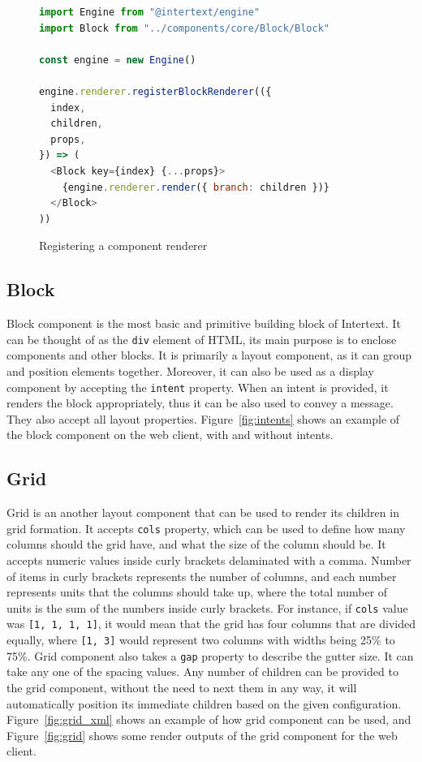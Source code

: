 \begin{figure}
\begin{minipage}{\linewidth}
\begin{lstlisting}[language=javascript]
import Engine from "@intertext/engine"
import Block from "../components/core/Block/Block"

const engine = new Engine()

engine.renderer.registerBlockRenderer(({
  index,
  children,
  props,
}) => (
  <Block key={index} {...props}>
    {engine.renderer.render({ branch: children })}
  </Block>
))
\end{lstlisting}
\end{minipage}
\caption{Registering a component renderer}%
\label{fig:registering_renderer}%
\end{figure}

\subsection{Block}

Block component is the most basic and primitive building block of Intertext. It can be thought of as the \texttt{div} element of HTML, its main purpose is to enclose components and other blocks. It is primarily a layout component, as it can group and position elements together. Moreover, it can also be used as a display component by accepting the \texttt{intent} property. When an intent is provided, it renders the block appropriately, thus it can be also used to convey a message. They also accept all layout properties. Figure~\ref{fig:intents} shows an example of the block component on the web client, with and without intents.

\subsection{Grid}

Grid is an another layout component that can be used to render its children in grid formation. It accepts \texttt{cols} property, which can be used to define how many columns should the grid have, and what the size of the column should be. It accepts numeric values inside curly brackets delaminated with a comma. Number of items in curly brackets represents the number of columns, and each number represents units that the columns should take up, where the total number of units is the sum of the numbers inside curly brackets. For instance, if \texttt{cols} value was \texttt{[1, 1, 1, 1]}, it would mean that the grid has four columns that are divided equally, where \texttt{[1, 3]} would represent two columns with widths being 25\% to 75\%. Grid component also takes a \texttt{gap} property to describe the gutter size. It can take any one of the spacing values. Any number of children can be provided to the grid component, without the need to next them in any way, it will automatically position its immediate children based on the given configuration. Figure~\ref{fig:grid_xml} shows an example of how grid component can be used, and Figure~\ref{fig:grid} shows some render outputs of the grid component for the web client.

